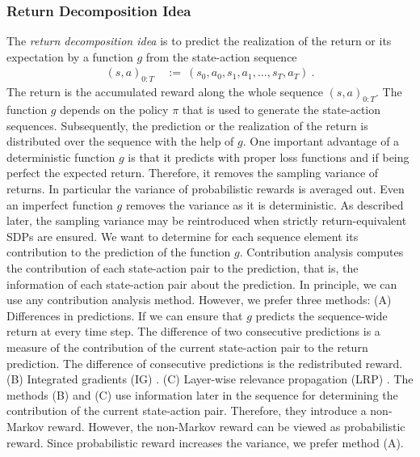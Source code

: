 \documentclass{article}
\begin{document}
\begin{appendices}
\subsubsection{Return Decomposition Idea}

The {\em return decomposition idea} is 
to predict the realization of the return or its
expectation by a function $g$ from the state-action sequence 
\begin{align}
 (s,a)_{0:T} \ &:= \  (s_0,a_0,s_1,a_1,\ldots,s_T,a_T) \ .
\end{align}
The return is the accumulated reward along the whole sequence
$(s,a)_{0:T}$.
The function $g$ depends on the policy $\pi$ that is used to 
generate the state-action sequences.
Subsequently, the prediction or the realization of the return
is distributed over
the sequence with the help of $g$.
One important advantage of a deterministic function $g$ is 
that it predicts with proper loss functions and if being perfect 
the expected return. Therefore, it 
removes the sampling variance of returns. 
In particular the variance of probabilistic rewards is averaged out. 
Even an imperfect function $g$ removes the variance as it is deterministic.
As described later, the sampling variance may be 
reintroduced when strictly return-equivalent SDPs are ensured.
We want to determine for each sequence element 
its contribution to the prediction of the function $g$. 
Contribution analysis computes the contribution of each 
state-action pair to the prediction, that is, the information of each
state-action pair about the prediction. 
In principle, we can use any contribution analysis method.
However, we prefer three methods:
(A) Differences in predictions.
If we can ensure that $g$ predicts the sequence-wide return
at every time step. 
The difference of two consecutive predictions is a measure of
the contribution of the current state-action pair to the return prediction.
The difference of consecutive predictions is the redistributed reward.
(B) Integrated gradients (IG) \cite{Sundararajan:17}.
(C) Layer-wise relevance propagation (LRP) \cite{Bach:15}.
The methods (B) and (C) use information later in the sequence for
determining the contribution of the current state-action pair. Therefore,
they introduce a non-Markov reward. 
However, the non-Markov reward can be viewed as probabilistic reward.
Since probabilistic reward increases the variance, we prefer method (A).


\end{appendices}
\end{document}
